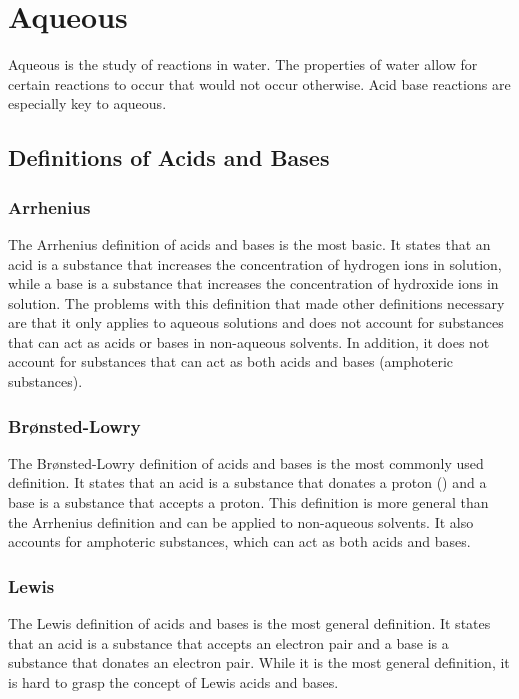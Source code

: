 \section{Aqueous}
Aqueous is the study of reactions in water. The properties of water allow for certain reactions to occur that would not occur otherwise. Acid base reactions are especially key to aqueous. 

\subsection{Definitions of Acids and Bases}
\subsubsection{Arrhenius}
The Arrhenius definition of acids and bases is the most basic. It states that an acid is a substance that increases the concentration of hydrogen ions in solution, while a base is a substance that increases the concentration of hydroxide ions in solution. The problems with this definition that made other definitions necessary are that it only applies to aqueous solutions and does not account for substances that can act as acids or bases in non-aqueous solvents. In addition, it does not account for substances that can act as both acids and bases (amphoteric substances).
\subsubsection{Brønsted-Lowry}
The Brønsted-Lowry definition of acids and bases is the most commonly used definition. It states that an acid is a substance that donates a proton () and a base is a substance that accepts a proton. This definition is more general than the Arrhenius definition and can be applied to non-aqueous solvents. It also accounts for amphoteric substances, which can act as both acids and bases.
\subsubsection{Lewis}\label{sec:lewis_acids_bases}
The Lewis definition of acids and bases is the most general definition. It states that an acid is a substance that accepts an electron pair and a base is a substance that donates an electron pair. While it is the most general definition, it is hard to grasp the concept of Lewis acids and bases.
